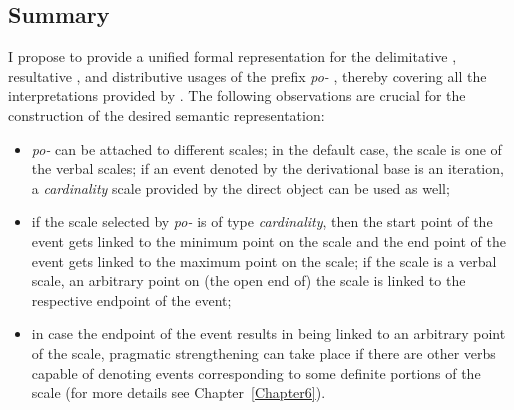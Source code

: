 \subsection{Summary}
I propose to provide a unified formal representation for the delimitative , resultative , and distributive  usages of the prefix \textit{po-}  , thereby covering all the interpretations provided by \citet{Shvedova:82}. The following observations are crucial for the construction of the desired semantic representation:

\begin{itemize}
\item \textit{po-}   can be attached to different scales; in the default case, the scale is one of the verbal scales; if an event denoted by the derivational base is an iteration, a \textit{cardinality} scale provided by the direct object can be used as well;
\item if the scale selected by \textit{po-}   is of type \textit{cardinality}, then the start point of the event gets linked to the minimum point on the scale and the end point of the event gets linked to the maximum point on the scale; if the scale is a verbal scale, an arbitrary point on (the open end of) the scale is linked to the respective endpoint of the event;
\item in case the endpoint of the event results in being linked to an arbitrary point of the scale, pragmatic strengthening can take place if there are other verbs capable of denoting events corresponding to some definite portions of the scale (for more details see Chapter~\ref{Chapter6}).
\end{itemize}



